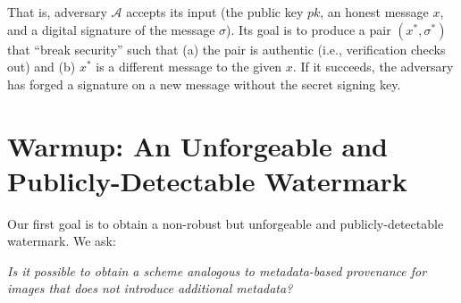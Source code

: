 \documentclass[12pt]{article}
\begin{document}
That is, adversary $\mathcal{A}$ accepts its input (the public key $pk$, an honest message $x$, and a digital signature of the message $\sigma$). Its goal is to produce a pair $(x^*, \sigma^*)$ that ``break security'' such that (a) the pair is authentic (i.e., verification checks out) and (b) $x^*$ is a different message to the given $x$. If it succeeds, the adversary has forged a signature on a new message without the secret signing key.

\section{Warmup: An Unforgeable and Publicly-Detectable Watermark}\label{sec:unforge_wm}

Our first goal is to obtain a non-robust but unforgeable and publicly-detectable watermark. We ask:
\begin{center}
    \textit{Is it possible to obtain a scheme analogous to metadata-based provenance for images that does not introduce additional metadata?}
\end{center}
\end{document}
